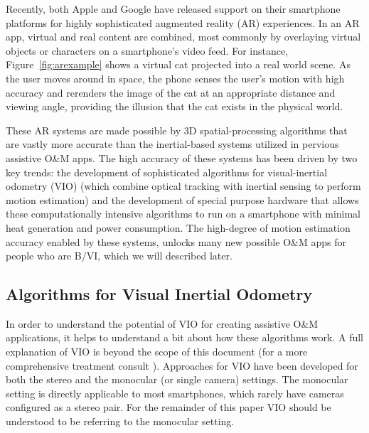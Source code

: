 \documentclass[chi_draft]{sigchi}
\newcommand{\BVI}{B/VI\xspace}
\newcommand{\OM}{O\&M\xspace}
\begin{document}
Recently, both Apple and Google have released support on their smartphone platforms for highly sophisticated augmented reality (AR) experiences.  In an AR app, virtual and real content are combined, most commonly by overlaying virtual objects or characters on a smartphone's video feed.  For instance, Figure~\ref{fig:arexample} shows a virtual cat projected into a real world scene.  As the user moves around in space, the phone senses the user's motion with high accuracy and rerenders the image of the cat at an appropriate distance and viewing angle, providing the illusion that the cat exists in the physical world.

These AR systems are made possible by 3D spatial-processing algorithms that are vastly more accurate than the inertial-based systems utilized in pervious assistive \OM apps.  The high accuracy of these systems has been driven by two key trends: the development of sophisticated algorithms for visual-inertial odometry (VIO) \cite{li2013high,leutenegger2015keyframe,bloesch2015robust,forster2014svo} (which combine optical tracking with inertial sensing to perform motion estimation) and the development of special purpose hardware that allows these computationally intensive algorithms to run on a smartphone with minimal heat generation and power consumption.  The high-degree of motion estimation accuracy enabled by these systems, unlocks many new possible \OM apps for people who are \BVI, which we will described later.

\subsection{Algorithms for Visual Inertial Odometry}
In order to understand the potential of VIO for creating assistive \OM applications, it helps to understand a bit about how these algorithms work.  A full explanation of VIO is beyond the scope of this document (for a more comprehensive treatment consult \cite{gui2015review}).  Approaches for VIO have been developed for both the stereo and the monocular (or single camera) settings.  The monocular setting is directly applicable to most smartphones, which rarely have cameras configured as a stereo pair.  For the remainder of this paper VIO should be understood to be referring to the monocular setting.
\end{document}
